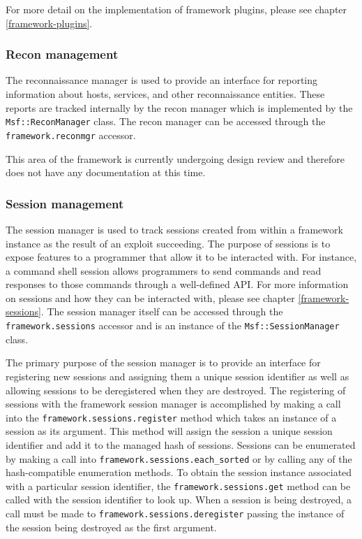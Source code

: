 \documentclass{report}
\begin{document}
\par
For more detail on the implementation of framework plugins, please
see chapter \ref{framework-plugins}.

            \subsubsection{Recon management}

\par
The reconnaissance manager is used to provide an interface for
reporting information about hosts, services, and other
reconnaissance entities.  These reports are tracked internally by
the recon manager which is implemented by the
\texttt{Msf::ReconManager} class.  The recon manager can be accessed
through the \texttt{framework.reconmgr} accessor.

\par
This area of the framework is currently undergoing design review and
therefore does not have any documentation at this time.

            \subsubsection{Session management}

\par
The session manager is used to track sessions created from within a
framework instance as the result of an exploit succeeding.  The
purpose of sessions is to expose features to a programmer that allow
it to be interacted with.  For instance, a command shell session
allows programmers to send commands and read responses to those
commands through a well-defined API.  For more information on
sessions and how they can be interacted with, please see chapter
\ref{framework-sessions}.  The session manager itself can be
accessed through the \texttt{framework.sessions} accessor and is an
instance of the \texttt{Msf::SessionManager} class.

\par
The primary purpose of the session manager is to provide an
interface for registering new sessions and assigning them a unique
session identifier as well as allowing sessions to be deregistered
when they are destroyed.  The registering of sessions with the
framework session manager is accomplished by making a call into the
\texttt{framework.sessions.register} method which takes an instance
of a session as its argument.  This method will assign the session a
unique session identifier and add it to the managed hash of
sessions.  Sessions can be enumerated by making a call into
\texttt{framework.sessions.each\_sorted} or by calling any of the
hash-compatible enumeration methods.  To obtain the session instance
associated with a particular session identifier, the
\texttt{framework.sessions.get} method can be called with the
session identifier to look up.  When a session is being destroyed, a
call must be made to \texttt{framework.sessions.deregister} passing
the instance of the session being destroyed as the first argument.
\end{document}

